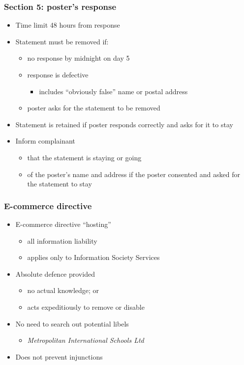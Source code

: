 \documentclass[ignorenonframetext,]{beamer}
\begin{document}
\begin{frame}
  \frametitle{Section 5: poster's response}
  \begin{itemize}
  \item Time limit 48 hours from response
  \item Statement must be removed if:
    \begin{itemize}
    \item no response by midnight on day 5
    \item response is defective
      \begin{itemize}
      \item includes ``obviously false'' name or postal address
      \end{itemize}
    \item poster asks for the statement to be removed
    \end{itemize}
  \item Statement is retained if poster responds correctly and asks for it to stay
  \item Inform complainant
    \begin{itemize}
    \item that the statement is staying or going
    \item of the poster's name and address if the poster consented and asked for the statement to stay
    \end{itemize}
  \end{itemize}
\end{frame}

\begin{frame}
\frametitle{E-commerce directive}

\begin{itemize}
\item  E-commerce directive ``hosting''

  \begin{itemize}
  \item    all information liability
  \item    applies only to Information Society Services
  \end{itemize}
\item  Absolute defence provided

  \begin{itemize}
  \item    no actual knowledge; or
  \item    acts expeditiously to remove or disable
  \end{itemize}
\item  {No need to search out potential libels}

  \begin{itemize}
  \item    {\it Metropolitan International Schools Ltd}
  \end{itemize}
\item  Does not prevent injunctions
\end{itemize}

\end{frame}
\end{document}

